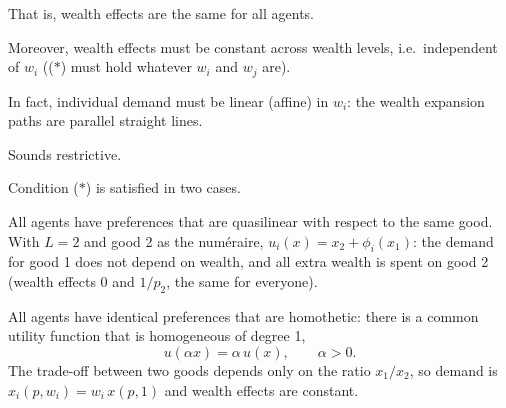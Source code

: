 \documentclass[11pt]{article}
\begin{document}
\begin{flatlist}
  \item That is, wealth effects are the same for all agents.
  \item Moreover, wealth effects must be constant across wealth levels,
        i.e.\ independent of $w_i$ (($*$) must hold whatever $w_i$ and $w_j$ are).
  \item In fact, individual demand must be linear (affine) in $w_i$: the wealth
        expansion paths are parallel straight lines.
\end{flatlist}
Sounds restrictive.

Condition ($*$) is satisfied in two cases.
\begin{flatnum}
  \item All agents have preferences that are quasilinear with respect to the same
        good. With $L=2$ and good 2 as the num\'eraire,
        $u_i(x)=x_2+\phi_i(x_1)$: the demand for good 1 does not depend on
        wealth, and all extra wealth is spent on good 2 (wealth effects $0$ and
        $1/p_2$, the same for everyone).
  \item All agents have identical preferences that are homothetic: there is a
        common utility function that is homogeneous of degree 1,
        \[ u(\alpha x)=\alpha\,u(x),\qquad \alpha>0. \]
        The trade-off between two goods depends only on the ratio $x_1/x_2$, so
        demand is $x_i(p,w_i)=w_i\,x(p,1)$ and wealth effects are constant.
\end{flatnum}

\begin{center}
\hspace{1.2cm}
\end{center}
\end{document}
